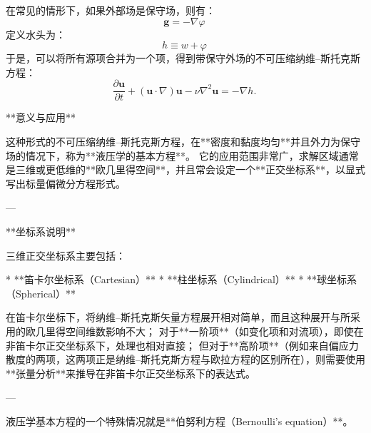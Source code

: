 在常见的情形下，如果外部场是保守场，则有：
$$
\mathbf{g} = -\nabla \varphi~
$$
定义水头为：
$$
h \equiv w + \varphi~
$$
于是，可以将所有源项合并为一个项，得到带保守外场的不可压缩纳维–斯托克斯方程：
$$
\frac{\partial \mathbf{u}}{\partial t}
+ (\mathbf{u} \cdot \nabla)\mathbf{u}
- \nu \nabla^2 \mathbf{u}
= -\nabla h.~
$$


**意义与应用**

这种形式的不可压缩纳维–斯托克斯方程，在**密度和黏度均匀**并且外力为保守场的情况下，称为**液压学的基本方程**。
它的应用范围非常广，求解区域通常是三维或更低维的**欧几里得空间**，并且常会设定一个**正交坐标系**，以显式写出标量偏微分方程形式。

---

**坐标系说明**

三维正交坐标系主要包括：

* **笛卡尔坐标系（Cartesian）**
* **柱坐标系（Cylindrical）**
* **球坐标系（Spherical）**

在笛卡尔坐标下，将纳维–斯托克斯矢量方程展开相对简单，而且这种展开与所采用的欧几里得空间维数影响不大；
对于**一阶项**（如变化项和对流项），即使在非笛卡尔正交坐标系下，处理也相对直接；
但对于**高阶项**（例如来自偏应力散度的两项，这两项正是纳维–斯托克斯方程与欧拉方程的区别所在），则需要使用**张量分析**来推导在非笛卡尔正交坐标系下的表达式。

---

液压学基本方程的一个特殊情况就是**伯努利方程（Bernoulli's equation）**。
